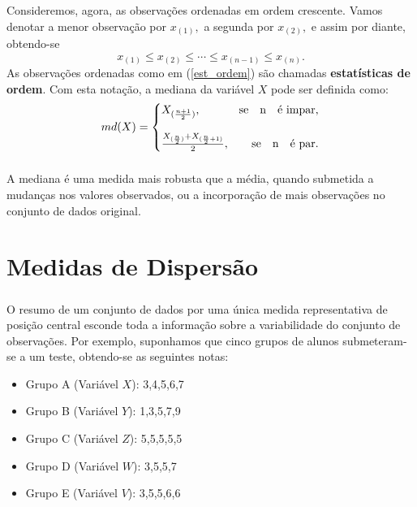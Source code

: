 \documentclass[14pt,aspectratio=1610]{beamer}
\begin{document}
\begin{frame}{}
\frametitle{}
\begin{block}{}
\justifying
Consideremos, agora, as observações ordenadas em ordem crescente. Vamos denotar a
menor observação por $x_{(1)},$ a segunda por $x_{(2)},$ e assim por diante, obtendo-se
\begin{equation}\label{est_ordem}
x_{(1)}\leq x_{(2)}\leq \cdots \leq x_{(n-1)}\leq x_{(n)}.
\end{equation}
As observações ordenadas como em (\ref{est_ordem}) são chamadas {\bf estatísticas de ordem}. Com esta notação, a mediana da variável $X$ pode ser definida como:
\[
md(X)=\left\{
\setlength\arraycolsep{0pt}
\begin{array}{lr}
X_{(\frac{n+1}{2})},                                             &\quad \textrm{se}\quad $n$\quad \textrm{é impar,}\\
&\\
\frac{X_{(\frac{n}{2})}+X_{(\frac{n}{2}+1)}}{2},  &\quad \textrm{se}\quad $n$\quad \textrm{é par.}\\
\end{array}
\right.
\]
\end{block}
\end{frame}

\begin{frame}{}
\frametitle{}
\begin{block}{}
\justifying
A mediana é uma medida mais robusta que a média, quando submetida a mudanças nos valores observados, ou a incorporação de mais observações no conjunto de dados original.
\end{block}
\end{frame}

\section{Medidas de Dispersão}
\begin{frame}{}
\frametitle{}
\begin{block}{}
\justifying
O resumo de um conjunto de dados por uma única medida representativa de posição
central esconde toda a informação sobre a variabilidade do conjunto de observações.
Por exemplo, suponhamos que cinco grupos de alunos submeteram-se a um
teste, obtendo-se as seguintes notas:
\begin{itemize}
\item Grupo A (Variável $X$): 3,4,5,6,7
\item Grupo B (Variável $Y$): 1,3,5,7,9
\item Grupo C (Variável $Z$): 5,5,5,5,5
\item Grupo D (Variável $W$): 3,5,5,7
\item Grupo E (Variável $V$): 3,5,5,6,6
\end{itemize}
\end{block}
\end{frame}
\end{document}
